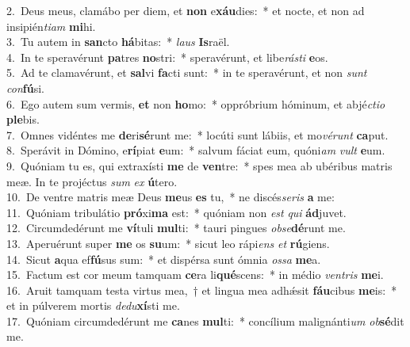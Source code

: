 {2.~}Deus meus, clamábo per diem, et \textbf{non} e\textbf{xáu}dies:~* et nocte, et non ad insipién\textit{ti}\textit{am} \textbf{mi}hi.\\
{3.~}Tu autem in \textbf{san}cto \textbf{há}bitas:~* \textit{laus} \textbf{Is}raël.\\
{4.~}In te speravérunt \textbf{pa}tres \textbf{no}stri:~* speravérunt, et libe\textit{rá}\textit{sti} \textbf{e}os.\\
{5.~}Ad te clamavérunt, et \textbf{sal}vi \textbf{fa}cti sunt:~* in te speravérunt, et non \textit{sunt} \textit{con}\textbf{fú}si.\\
{6.~}Ego autem sum vermis, \textbf{et} non \textbf{ho}mo:~* oppróbrium hóminum, et abjé\textit{cti}\textit{o} \textbf{ple}bis.\\
{7.~}Omnes vidéntes me \textbf{de}ri\textbf{sé}runt me:~* locúti sunt lábiis, et mo\textit{vé}\textit{runt} \textbf{ca}put.\\
{8.~}Sperávit in Dómino, e\textbf{rí}piat \textbf{e}um:~* salvum fáciat eum, quóni\textit{am} \textit{vult} \textbf{e}um.\\
{9.~}Quóniam tu es, qui extraxísti \textbf{me} de \textbf{ven}tre:~* spes mea ab ubéribus matris meæ. In te projéctus \textit{sum} \textit{ex} \textbf{ú}tero.\\
{10.~}De ventre matris meæ Deus \textbf{me}us \textbf{es} tu,~* ne discés\textit{se}\textit{ris} \textbf{a} me:\\
{11.~}Quóniam tribulátio \textbf{pró}xi\textbf{ma} est:~* quóniam non \textit{est} \textit{qui} \textbf{ád}juvet.\\
{12.~}Circumdedérunt me \textbf{ví}tuli \textbf{mul}ti:~* tauri pingues \textit{ob}\textit{se}\textbf{dé}runt me.\\
{13.~}Aperuérunt super \textbf{me} os \textbf{su}um:~* sicut leo rápi\textit{ens} \textit{et} \textbf{rú}giens.\\
{14.~}Sicut \textbf{a}qua ef\textbf{fú}sus sum:~* et dispérsa sunt ómnia \textit{os}\textit{sa} \textbf{me}a.\\
{15.~}Factum est cor meum tamquam \textbf{ce}ra li\textbf{qué}scens:~* in médio \textit{ven}\textit{tris} \textbf{me}i.\\
{16.~}Aruit tamquam testa virtus mea,~† et lingua mea adhǽsit \textbf{fáu}cibus \textbf{me}is:~* et in púlverem mortis \textit{de}\textit{du}\textbf{xí}sti me.\\
{17.~}Quóniam circumdedérunt me \textbf{ca}nes \textbf{mul}ti:~* concílium malignánti\textit{um} \textit{ob}\textbf{sé}dit me.\\
